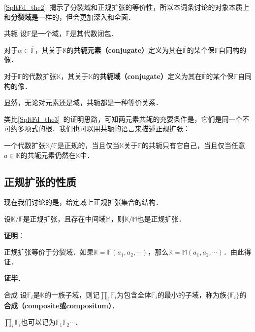 

\autoref{SpltFd_the2}~揭示了分裂域和正规扩张的等价性，所以本词条讨论的对象本质上和\textbf{分裂域}是一样的，但会更加深入和全面．


\begin{definition}{共轭}
设$\mathbb{F}$是一个域，$\overline{\mathbb{F}}$是其代数闭包．

对于$\alpha\in\overline{\mathbb{F}}$，其关于$\mathbb{K}$的\textbf{共轭元素（conjugate）}定义为其在$\overline{\mathbb{F}}$的某个保$\mathbb{F}$自同构的像．

对于$\mathbb{F}$的代数扩张$\mathbb{K}$，其关于$\mathbb{K}$的\textbf{共轭域（conjugate）}定义为其在$\overline{\mathbb{F}}$的某个保$\mathbb{F}$自同构的像．
\end{definition}

显然，无论对元素还是域，共轭都是一种等价关系．

类比\autoref{SpltFd_the3}~的证明思路，可知两元素共轭的充要条件是，它们是同一个不可约多项式的根．我们也可以用共轭的语言来描述正规扩张：

\begin{theorem}{}\label{NomEx_the1}
一个代数扩张$\mathbb{K}/\mathbb{F}$是正规的，当且仅当$\mathbb{K}$关于$\mathbb{F}$的共轭只有它自己，当且仅当任意$a\in\mathbb{K}$的共轭元素仍然在$\mathbb{K}$中．
\end{theorem}



\subsection{正规扩张的性质}

现在我们讨论的是，给定域上正规扩张集合的结构．

\begin{theorem}{}
设$\mathbb{K}/\mathbb{F}$是正规扩张，且存在中间域$\mathbb{M}$，则$\mathbb{K}/\mathbb{M}$也是正规扩张．
\end{theorem}

\textbf{证明}：

正规扩张等价于分裂域．如果$\mathbb{K}=\mathbb{F}(a_1, a_2, \cdots)$，那么$\mathbb{K}=\mathbb{M}(a_1, a_2, \cdots)$．由此得证．

\textbf{证毕}．


\begin{definition}{合成}
设$\mathbb{F}_i$是$\mathbb{K}$的一族子域，则记$\prod_{i}\mathbb{F}_i$为包含全体$\mathbb{F}_i$的最小的子域，称为族$\{\mathbb{F}_i\}$的\textbf{合成（composite或compositum）}．

$\prod_{i}\mathbb{F}_i$也可以记为$\mathbb{F}_1\mathbb{F}_2\cdots$．
\end{definition}


